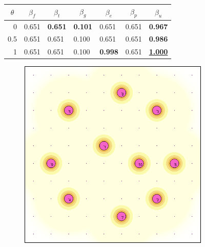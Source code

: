 \documentclass[letterpaper, 10 pt, conference]{ieeeconf}
\begin{document}
\begin{figure}[!h]
\begin{minipage}{\columnwidth}
{\begin{tabular}{|lllllll|}
\multicolumn{1}{|c|}{\textbf{$\theta$}} & \multicolumn{1}{c|}{\textbf{$\beta_f$}} & \multicolumn{1}{c|}{\textbf{$\beta_t$}} & \multicolumn{1}{c|}{\textbf{$\beta_g$}} & \multicolumn{1}{c|}{\textbf{$\beta_e$}} & \multicolumn{1}{c|}{\textbf{$\beta_p$}} & \multicolumn{1}{c|}{\textbf{$\beta_u$}} \\ \hline
\multicolumn{1}{|r|}{0} & \multicolumn{1}{l|}{0.651} & \multicolumn{1}{l|}{\textbf{0.651}} & \multicolumn{1}{l|}{\textbf{0.101}} & \multicolumn{1}{l|}{0.651} & \multicolumn{1}{l|}{0.651} & \textbf{0.967} \\ \hline
\multicolumn{1}{|r|}{0.5} & \multicolumn{1}{l|}{0.651} & \multicolumn{1}{l|}{0.651} & \multicolumn{1}{l|}{0.100} & \multicolumn{1}{l|}{0.651} & \multicolumn{1}{l|}{0.651} & \textbf{0.986} \\ \hline
\multicolumn{1}{|r|}{1} & \multicolumn{1}{l|}{0.651} & \multicolumn{1}{l|}{0.651} & \multicolumn{1}{l|}{0.100} & \multicolumn{1}{l|}{\textbf{0.998}} & \multicolumn{1}{l|}{0.651} & {\ul \textbf{1.000}} \\ \hline
\end{tabular}%
}
\vspace{3mm}
\end{minipage}
\centering
\begin{subfigure}[t]{0.3\columnwidth}
    \centering
    \includegraphics[width=\columnwidth]{Figures/BlankDecay05.png}

\end{subfigure}
\end{figure}
\end{document}
